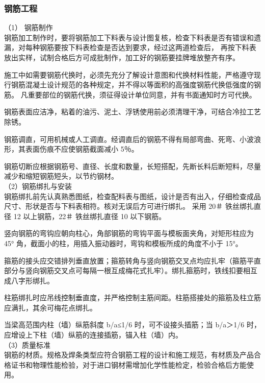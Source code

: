 \subsubsection{钢筋工程}

（1） 钢筋制作\\

钢筋加工制作时，要将钢筋加工下料表与设计图复核，检查下料表是否有错误和遗漏，对每种钢筋要按下料表检查是否达到要求，经过这两道检查后，
再按下料表放出实样，试制合格后方可成批制作，加工好的钢筋要挂牌堆放整齐有序。

施工中如需要钢筋代换时，必须先充分了解设计意图和代换材料性能，严格遵守现行钢筋混凝土设计规范的各种规定，并不得以等面积的高强度钢筋代换低强度的钢筋。
凡重要部位的钢筋代换，须征得设计单位同意，并有书面通知时方可代换。

 钢筋表面应洁净，粘着的油污、泥土、浮锈使用前必须清理干净，可结合冷拉工艺除锈。

 钢筋调直，可用机械或人工调直。经调直后的钢筋不得有局部弯曲、死弯、小波浪形，其表面伤痕不应使钢筋截面减小 5％。

 钢筋切断应根据钢筋号、直径、长度和数量，长短搭配，先断长料后断短料，尽量减少和缩短钢筋短头，以节约钢材。\\


（2）钢筋绑扎与安装\\

钢筋绑扎前先认真熟悉图纸，检查配料表与图纸，设计是否有出入，仔细检查成品尺寸、形状是否与下料表相符。核对无误后方可进行绑扎。
采用 20＃ 铁丝绑扎直径 12 以上钢筋，22＃ 铁丝绑扎直径 10 以下钢筋。

 竖向钢筋的弯钩应朝向柱心，角部钢筋的弯钩平面与模板面夹角，对矩形柱应为 45° 角，截面小的柱，用插入振动器时，弯钩和模板所成的角度不小于 15°。

 箍筋的接头应交错排列垂直放置；箍筋转角与竖向钢筋交叉点均应扎牢（箍筋平直部分与竖向钢筋交叉点可每隔一根互成梅花式扎牢）。绑扎箍筋时，铁线扣要相互成八字形绑扎。

 柱筋绑扎时应吊线控制垂直度，并严格控制主筋间距。柱筋搭接处的箍筋及柱立筋应满扎，其余可梅花点绑扎。

 当梁高范围内柱（墙）纵筋斜度 b/a≤1/6 时，可不设接头插筋；当 b/a＞1/6 时，应增设上下柱（墙）纵筋的连接插筋，锚入柱（墙）内。 \\

（3）质量标准\\

 钢筋的材质。规格及焊条类型应符合钢筋工程的设计和施工规范，有材质及产品合格证书和物理性能检验，对于进口钢材需增加化学性能检定，检验合格后方能使用。


